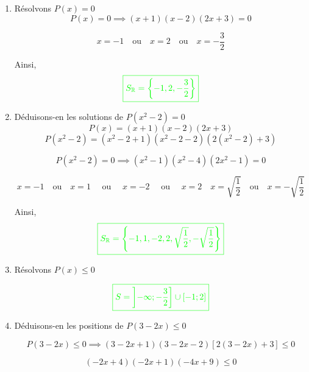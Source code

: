 \documentclass[12pt,a4paper]{article}
\begin{document}
\begin{enumerate}
\item Résolvons \( P(x) = 0 \)
\[
P(x) = 0 \implies (x+1)(x-2)(2x+3) = 0
\]
  
\[
x = -1 \quad \text{ou} \quad x = 2 \quad \text{ou} \quad x = -\frac{3}{2}
\]

Ainsi,  
\[
\textcolor{green}{\boxed{S_{\mathbb{R}} = \left\{ -1, 2, -\frac{3}{2} \right\}}}
\]

\item Déduisons-en les solutions de \( P(x^2 - 2) = 0 \)
 \[ P(x) = (x+1)(x-2)(2x+3) \]
\[
P(x^2 - 2) = (x^2 - 2 + 1)(x^2 - 2 - 2)(2(x^2 - 2) + 3)
\]

\[
P(x^2 - 2) = 0 \implies (x^2 - 1)(x^2-4)(2x^2 - 1) = 0
\]
 
\[
x = -1 \quad \text{ou} \quad x = 1 \quad \text{ ou } \quad x=-2 \quad \text{ ou } \quad x=2\quad x = \sqrt{\frac{1}{2}} \quad \text{ou} \quad x = -\sqrt{\frac{1}{2}}
\]

Ainsi,  
\[
\textcolor{green}{\boxed{S_{\mathbb{R}} = \left\{ -1, 1, -2,2, \sqrt{\frac{1}{2}}, -\sqrt{\frac{1}{2}} \right\}}} 
\]

\item  Résolvons \( P(x) \leq 0 \)

\begin{center}
\end{center}
\[
\textcolor{green}{\boxed{S = \left] -\infty ; -\frac{3}{2}\right] \cup \left[ -1;2\right] }} 
\]
\item Déduisons-en les positions de \( P(3-2x) \leq 0 \)

\[
P(3-2x) \leq 0 \implies 
\left( 3 - 2x + 1 \right)\left( 3 - 2x - 2 \right)\left[ 2\left( 3 - 2x \right) + 3 \right] \leq 0
\]

\[
\left( -2x + 4 \right)\left( -2x + 1 \right)\left( -4x + 9 \right) \leq 0
\]
\begin{center}
\end{center}
\end{enumerate}
\end{document}

